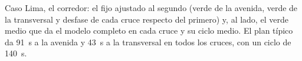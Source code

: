 
\begin{table}[!tbp]
\centering
\footnotesize
\setlength{\tabcolsep}{3pt}

\caption[Caso Lima, el corredor: el fijo ajustado al segundo y lo que hace el modelo]{Caso Lima, el corredor: el fijo ajustado al segundo (verde de la avenida, verde de la transversal y desfase de cada cruce respecto del primero) y, al lado, el verde medio que da el modelo completo en cada cruce y su ciclo medio. El plan típico da 91~s a la avenida y 43~s a la transversal en todos los cruces, con un ciclo de 140~s.}
\label{tab:corredor-planes}
\end{table}

